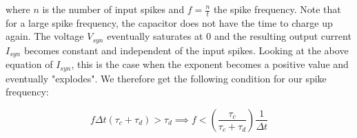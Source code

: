 where $n$ is the number of input spikes and $f = \frac{n}{t}$ the spike frequency. Note that for a large spike frequency, the capacitor does not have the time to charge up again. The voltage $V_{syn}$ eventually saturates at 0 and the resulting output current $I_{syn}$ becomes constant and independent of the input spikes. Looking at the above equation of $I_{syn}$, this is the case when the exponent becomes a positive value and eventually "explodes". We therefore get the following condition for our spike frequency:

\begin{equation}
    f \Delta t (\tau_c + \tau_d) > \tau_d \implies f < (\frac{\tau_c}{\tau_c+\tau_d}) \frac{1}{\Delta t}
\end{equation}

